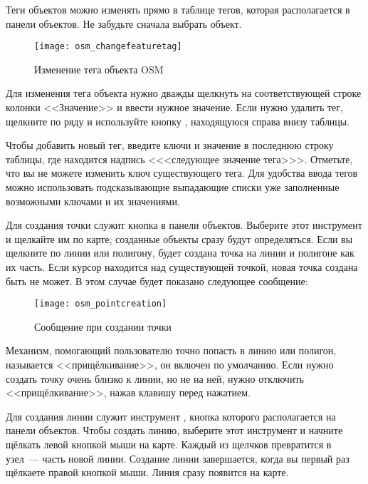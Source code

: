 
Теги объектов можно изменять прямо в таблице тегов, которая
располагается в панели объектов. Не забудьте сначала выбрать объект.

\begin{figure}[ht]
   \centering
   \texttt{[image: osm\_changefeaturetag]}
   \caption{Изменение тега объекта OSM \wincaption}\label{fig:osmchfeattag}
\end{figure}

Для изменения тега объекта нужно дважды щелкнуть на соответствующей
строке колонки <<Значение>> и ввести нужное значение. Если нужно удалить
тег, щелкните по ряду и используйте кнопку ,
находящуюся справа внизу таблицы.

Чтобы добавить новый тег, введите ключи и значение в последнюю строку
таблицы, где находится надпись <<<следующее значение тега>>>. Отметьте,
что вы не можете изменить ключ существующего тега. Для удобства ввода
тегов можно использовать подсказывающие выпадающие списки уже заполненные
возможными ключами и их значениями.


Для создания точки служит кнопка 
в панели объектов. Выберите этот инструмент и щелкайте им по карте, созданные
объекты сразу будут определяться. Если вы щелкните по линии или полигону,
будет создана точка на линии и полигоне как их часть. Если курсор находится
над существующей точкой, новая точка создана быть не может. В этом случае
будет показано следующее сообщение:

\begin{figure}[ht]
   \centering
   \texttt{[image: osm\_pointcreation]}
   \caption{Сообщение при создании точки \wincaption}\label{fig:osmpoicreat}
\end{figure}

Механизм, помогающий пользователю точно попасть в линию или полигон,
называется <<прищёлкивание>>, он включен по умолчанию. Если нужно создать
точку очень близко к линии, но не на ней, нужно отключить <<прищёлкивание>>,
нажав клавишу  перед нажатием.


Для создания линии служит инструмент ,
кнопка которого располагается на панели объектов. Чтобы создать линию,
выберите этот инструмент и начните щёлкать левой кнопкой мыши на карте.
Каждый из щелчков превратится в узел~--- часть новой линии. Создание
линии завершается, когда вы первый раз щёлкаете правой кнопкой мыши.
Линия сразу появится на карте.

